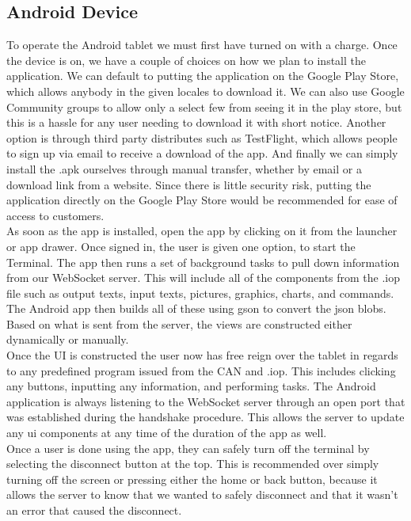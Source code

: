 \documentclass[paper=a4, fontsize=11pt]{scrartcl}
\numberwithin{equation}{section}		%
\numberwithin{figure}{section}			%
\numberwithin{table}{section}				%
\begin{document}
 \subsection{Android Device} 
 To operate the Android tablet we must first have turned on with a charge. Once the device is on, we have a couple of choices on how we plan to install the application. We can default to putting the application on the Google Play Store, which allows anybody in the given locales to download it. We can also use Google Community groups to allow only a select few from seeing it in the play store, but this is a hassle for any user needing to download it with short notice. Another option is through third party distributes such as TestFlight, which allows people to sign up via email to receive a download of the app. And finally we can simply install the .apk ourselves through manual transfer, whether by email or a download link from a website. Since there is little security risk, putting the application directly on the Google Play Store would be recommended for ease of access to customers. \\

 As soon as the app is installed, open the app by clicking on it from the launcher or app drawer. Once signed in, the user is given one option, to start the Terminal. The app then runs a set of background tasks to pull down information from our WebSocket server. This will include all of the components from the .iop file such as output texts, input texts, pictures, graphics, charts, and commands. The Android app then builds all of these using gson to convert the json blobs. Based on what is sent from the server, the views are constructed either dynamically or manually. \\

 Once the UI is constructed the user now has free reign over the tablet in regards to any predefined program issued from the CAN and .iop. This includes clicking any buttons, inputting any information, and performing tasks. The Android application is always listening to the WebSocket server through an open port that was established during the handshake procedure. This allows the server to update any ui components at any time of the duration of the app as well. \\

 Once a user is done using the app, they can safely turn off the terminal by selecting the disconnect button at the top. This is recommended over simply turning off the screen or pressing either the home or back button, because it allows the server to know that we wanted to safely disconnect and that it wasn't an error that caused the disconnect. \\
\end{document}
